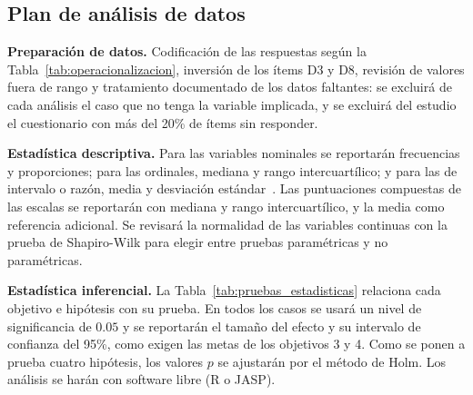 \documentclass[12pt,letterpaper]{article}
\numberwithin{table}{section}
\numberwithin{figure}{section}
\begin{document}
\subsection{Plan de análisis de datos}

\textbf{Preparación de datos.} Codificación de las respuestas según la Tabla~\ref{tab:operacionalizacion}, inversión de los ítems D3 y D8, revisión de valores fuera de rango y tratamiento documentado de los datos faltantes: se excluirá de cada análisis el caso que no tenga la variable implicada, y se excluirá del estudio el cuestionario con más del 20\% de ítems sin responder.

\textbf{Estadística descriptiva.} Para las variables nominales se reportarán frecuencias y proporciones; para las ordinales, mediana y rango intercuartílico; y para las de intervalo o razón, media y desviación estándar~\cite{montgomery2018applied}. Las puntuaciones compuestas de las escalas se reportarán con mediana y rango intercuartílico, y la media como referencia adicional. Se revisará la normalidad de las variables continuas con la prueba de Shapiro-Wilk para elegir entre pruebas paramétricas y no paramétricas.

\textbf{Estadística inferencial.} La Tabla~\ref{tab:pruebas_estadisticas} relaciona cada objetivo e hipótesis con su prueba. En todos los casos se usará un nivel de significancia de $0.05$ y se reportarán el tamaño del efecto y su intervalo de confianza del 95\%, como exigen las metas de los objetivos 3 y 4. Como se ponen a prueba cuatro hipótesis, los valores $p$ se ajustarán por el método de Holm. Los análisis se harán con software libre (R o JASP).
\end{document}
